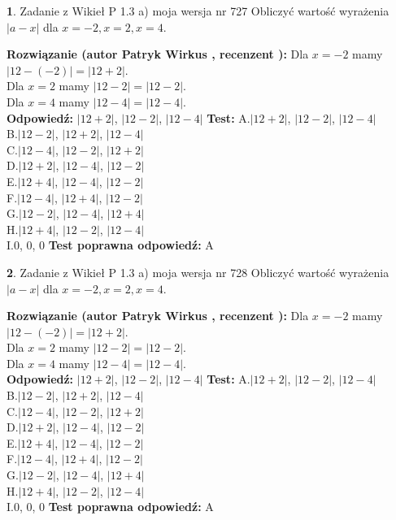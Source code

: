 \documentclass[12pt, a4paper]{article}
\theoremstyle{definition} %
\newtheorem{zad}{}
\newcommand{\zadStart}[1]{\begin{zad}#1\newline}
\newcommand{\zadStop}{\end{zad}}
\newcommand{\rozwStart}[2]{\noindent \textbf{Rozwiązanie (autor #1 , recenzent #2): }\newline}
\newcommand{\rozwStop}{\newline}
\newcommand{\odpStart}{\noindent \textbf{Odpowiedź:}\newline}
\newcommand{\odpStop}{\newline}
\newcommand{\testStart}{\noindent \textbf{Test:}\newline}
\newcommand{\testStop}{\newline}
\newcommand{\kluczStart}{\noindent \textbf{Test poprawna odpowiedź:}\newline}
\newcommand{\kluczStop}{\newline}
\begin{document}
\zadStart{Zadanie z Wikieł P 1.3 a) moja wersja nr 727}
Obliczyć wartość wyrażenia $|a - x|$ dla $x=-2,x=2,x=4$.
\zadStop
\rozwStart{Patryk Wirkus}{}
Dla $x = -2$ mamy $|12 - (-2)| = |12 + 2|$.\\
Dla $x = 2$ mamy $|12 - 2| = |12 - 2|$.\\
Dla $x = 4$ mamy $|12 - 4| = |12 - 4|$.\\
\rozwStop
\odpStart
$|12 + 2|$, $|12 - 2|$, $|12 - 4|$
\odpStop
\testStart
A.$|12 + 2|$, $|12 - 2|$, $|12 - 4|$\\
B.$|12 - 2|$, $|12 + 2|$, $|12 - 4|$\\
C.$|12 - 4|$, $|12 - 2|$, $|12 + 2|$\\
D.$|12 + 2|$, $|12 - 4|$, $|12 - 2|$\\
E.$|12 + 4|$, $|12 - 4|$, $|12 - 2|$\\
F.$|12 - 4|$, $|12 + 4|$, $|12 - 2|$\\
G.$|12 - 2|$, $|12 - 4|$, $|12 + 4|$\\
H.$|12 + 4|$, $|12 - 2|$, $|12 - 4|$\\
I.$0$, $0$, $0$
\testStop
\kluczStart
A
\kluczStop



\zadStart{Zadanie z Wikieł P 1.3 a) moja wersja nr 728}
Obliczyć wartość wyrażenia $|a - x|$ dla $x=-2,x=2,x=4$.
\zadStop
\rozwStart{Patryk Wirkus}{}
Dla $x = -2$ mamy $|12 - (-2)| = |12 + 2|$.\\
Dla $x = 2$ mamy $|12 - 2| = |12 - 2|$.\\
Dla $x = 4$ mamy $|12 - 4| = |12 - 4|$.\\
\rozwStop
\odpStart
$|12 + 2|$, $|12 - 2|$, $|12 - 4|$
\odpStop
\testStart
A.$|12 + 2|$, $|12 - 2|$, $|12 - 4|$\\
B.$|12 - 2|$, $|12 + 2|$, $|12 - 4|$\\
C.$|12 - 4|$, $|12 - 2|$, $|12 + 2|$\\
D.$|12 + 2|$, $|12 - 4|$, $|12 - 2|$\\
E.$|12 + 4|$, $|12 - 4|$, $|12 - 2|$\\
F.$|12 - 4|$, $|12 + 4|$, $|12 - 2|$\\
G.$|12 - 2|$, $|12 - 4|$, $|12 + 4|$\\
H.$|12 + 4|$, $|12 - 2|$, $|12 - 4|$\\
I.$0$, $0$, $0$
\testStop
\kluczStart
A
\kluczStop
\end{document}
